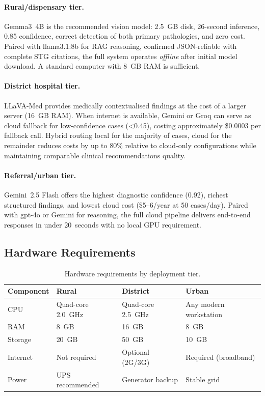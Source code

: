\documentclass[12pt,a4paper]{report}
\begin{document}
\paragraph{Rural/dispensary tier.}
Gemma3~4B is the recommended vision model: 2.5~GB disk, 26-second inference,
0.85 confidence, correct detection of both primary pathologies, and zero cost.
Paired with llama3.1:8b for RAG reasoning, confirmed JSON-reliable with complete
STG citations, the full system operates \emph{offline} after initial model
download. A standard computer with 8~GB RAM is sufficient.

\paragraph{District hospital tier.}
LLaVA-Med provides medically contextualised findings at the cost of a larger
server (16~GB RAM). When internet is available, Gemini or Groq can serve as
cloud fallback for low-confidence cases (\textless0.45), costing approximately
\$0.0003 per fallback call. Hybrid routing local for the majority of cases,
cloud for the remainder reduces costs by up to 80\% relative to cloud-only
configurations while maintaining comparable clinical recommendations quality.

\paragraph{Referral/urban tier.}
Gemini~2.5 Flash offers the highest diagnostic confidence (0.92), richest
structured findings, and lowest cloud cost (\$5--6/year at 50 cases/day).
Paired with gpt-4o or Gemini for reasoning, the full cloud pipeline delivers
end-to-end responses in under 20~seconds with no local GPU requirement.

\subsection{Hardware Requirements}

\begin{table}[H]
\centering
\caption{Hardware requirements by deployment tier.}
\label{tab:hardware_requirements}
\small
\renewcommand{\arraystretch}{1.2}
\begin{tabularx}{\textwidth}{@{}l X X X@{}}
\toprule
\textbf{Component} & \textbf{Rural} & \textbf{District} & \textbf{Urban} \\
\midrule
CPU      & Quad-core 2.0~GHz & Quad-core 2.5~GHz & Any modern workstation \\
RAM      & 8~GB              & 16~GB             & 8~GB \\
Storage  & 20~GB             & 50~GB             & 10~GB \\
Internet & Not required      & Optional (2G/3G)  & Required (broadband) \\
Power    & UPS recommended   & Generator backup  & Stable grid \\
\bottomrule
\end{tabularx}
\end{table}
\end{document}

